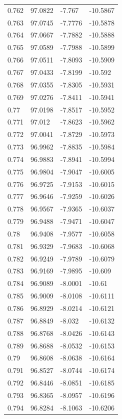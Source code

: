 \begin{tabular}{llll}
0.762 & 97.0822 & -7.767 & -10.5867 \\
0.763 & 97.0745 & -7.7776 & -10.5878 \\
0.764 & 97.0667 & -7.7882 & -10.5888 \\
0.765 & 97.0589 & -7.7988 & -10.5899 \\
0.766 & 97.0511 & -7.8093 & -10.5909 \\
0.767 & 97.0433 & -7.8199 & -10.592 \\
0.768 & 97.0355 & -7.8305 & -10.5931 \\
0.769 & 97.0276 & -7.8411 & -10.5941 \\
0.77 & 97.0198 & -7.8517 & -10.5952 \\
0.771 & 97.012 & -7.8623 & -10.5962 \\
0.772 & 97.0041 & -7.8729 & -10.5973 \\
0.773 & 96.9962 & -7.8835 & -10.5984 \\
0.774 & 96.9883 & -7.8941 & -10.5994 \\
0.775 & 96.9804 & -7.9047 & -10.6005 \\
0.776 & 96.9725 & -7.9153 & -10.6015 \\
0.777 & 96.9646 & -7.9259 & -10.6026 \\
0.778 & 96.9567 & -7.9365 & -10.6037 \\
0.779 & 96.9488 & -7.9471 & -10.6047 \\
0.78 & 96.9408 & -7.9577 & -10.6058 \\
0.781 & 96.9329 & -7.9683 & -10.6068 \\
0.782 & 96.9249 & -7.9789 & -10.6079 \\
0.783 & 96.9169 & -7.9895 & -10.609 \\
0.784 & 96.9089 & -8.0001 & -10.61 \\
0.785 & 96.9009 & -8.0108 & -10.6111 \\
0.786 & 96.8929 & -8.0214 & -10.6121 \\
0.787 & 96.8849 & -8.032 & -10.6132 \\
0.788 & 96.8768 & -8.0426 & -10.6143 \\
0.789 & 96.8688 & -8.0532 & -10.6153 \\
0.79 & 96.8608 & -8.0638 & -10.6164 \\
0.791 & 96.8527 & -8.0744 & -10.6174 \\
0.792 & 96.8446 & -8.0851 & -10.6185 \\
0.793 & 96.8365 & -8.0957 & -10.6196 \\
0.794 & 96.8284 & -8.1063 & -10.6206 \\

\end{tabular}
